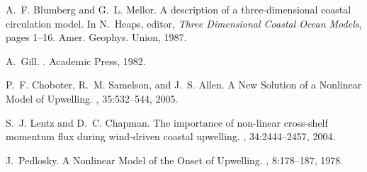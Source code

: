 \documentclass[10pt]{ucthesis}
\newtheorem{definition}{Definition}[chapter]
\begin{document}











\clearpage

%
%

\begin{thebibliography}{9}


A.~F. Blumberg and G.~L. Mellor.
\newblock A description of a three-dimensional coastal circulation model.
\newblock In N.~Heaps, editor, {\em Three Dimensional Coastal Ocean Models},
  pages 1--16. Amer. Geophys. Union, 1987.

A.~Gill.
.
\newblock Academic Press, 1982.

P.~F. Choboter, R.~M. Samelson, and J.~S. Allen.
\newblock A {N}ew {S}olution of a {N}onlinear {M}odel of {U}pwelling.
, 35:532--544, 2005.

S.~J. Lentz and D.~C. Chapman.
\newblock The importance of non-linear cross-shelf momentum flux during
  wind-driven coastal upwelling.
, 34:2444--2457, 2004.

J.~Pedlosky.
\newblock A {N}onlinear {M}odel of the {O}nset of {U}pwelling.
, 8:178--187, 1978.

\end{thebibliography}
\end{document}
